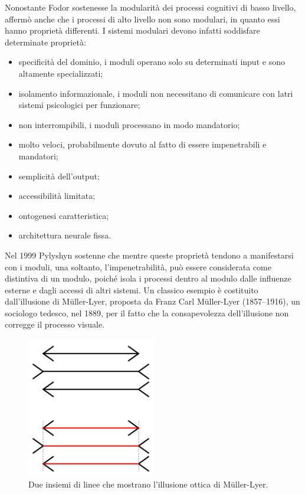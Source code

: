 Nonostante Fodor sostenesse la modularità dei processi cognitivi di basso livello, affermò anche che i processi di alto livello non sono modulari, in quanto essi hanno proprietà differenti. I sistemi modulari devono infatti soddisfare determinate proprietà:
\begin{itemize}
  \item specificità del dominio, i moduli operano solo su determinati input e sono altamente specializzati;
  \item isolamento informazionale, i moduli non necessitano di comunicare con latri sistemi psicologici per funzionare;
  \item non interrompibili, i moduli processano in modo mandatorio;
  \item molto veloci, probabilmente dovuto al fatto di essere impenetrabili e mandatori;
  \item semplicità dell’output;
  \item accessibilità limitata;
  \item ontogenesi caratteristica;
  \item architettura neurale fissa.
\end{itemize}

Nel 1999 Pylyshyn sostenne che mentre queste proprietà tendono a manifestarsi con i moduli, una soltanto, l’impenetrabilità, può essere considerata come distintiva di un modulo, poiché isola i processi dentro al modulo dalle influenze esterne e dagli accessi di altri sistemi. Un classico esempio è costituito dall’illusione di Müller-Lyer, proposta da Franz Carl Müller-Lyer (1857–1916), un sociologo tedesco, nel 1889, per il fatto che la consapevolezza dell’illusione non corregge il processo visuale.

\begin{figure}[hbt]
  \centering
  \includegraphics[width=0.5\textwidth]{img/Muller-Lyer_illusion}
  \caption{Due insiemi di linee che mostrano l'illusione ottica di Müller-Lyer.}
  \label{fig:illusioneMuller}
\end{figure}

